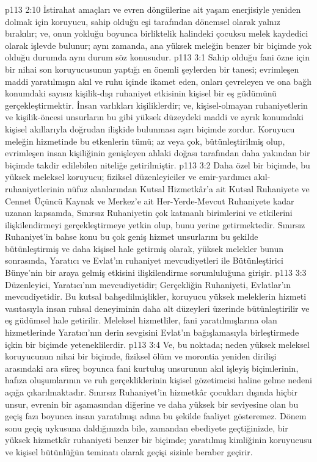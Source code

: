 \vs p113 2:10 İstirahat amaçları ve evren döngülerine ait yaşam enerjisiyle yeniden dolmak için koruyucu, sahip olduğu eşi tarafından dönemsel olarak yalnız bırakılır; ve, onun yokluğu boyunca birliktelik halindeki çocuksu melek kaydedici olarak işlevde bulunur; aynı zamanda, ana yüksek meleğin benzer bir biçimde yok olduğu durumda aynı durum söz konusudur.
\vs p113 3:1 Sahip olduğu fani özne için bir nihai son koruyucusunun yaptığı en önemli şeylerden bir tanesi; evrimleşen maddi yaratılmışın akıl ve ruhu içinde ikamet eden, onları çevreleyen ve ona bağlı konumdaki sayısız kişilik\hyp{}dışı ruhaniyet etkisinin kişisel bir eş güdümünü gerçekleştirmektir. İnsan varlıkları kişiliklerdir; ve, kişisel\hyp{}olmayan ruhaniyetlerin ve kişilik\hyp{}öncesi unsurların bu gibi yüksek düzeydeki maddi ve ayrık konumdaki kişisel akıllarıyla doğrudan ilişkide bulunması aşırı biçimde zordur. Koruyucu meleğin hizmetinde bu etkenlerin tümü; az veya çok, bütünleştirilmiş olup, evrimleşen insan kişiliğinin genişleyen ahlaki doğası tarafından daha yakından bir biçimde takdir edilebilen niteliğe getirilmiştir.
\vs p113 3:2 Daha özel bir biçimde, bu yüksek meleksel koruyucu; fiziksel düzenleyiciler ve emir\hyp{}yardımcı akıl\hyp{}ruhaniyetlerinin nüfuz alanlarından Kutsal Hizmetkâr’a ait Kutsal Ruhaniyete ve Cennet Üçüncü Kaynak ve Merkez’e ait Her\hyp{}Yerde\hyp{}Mevcut Ruhaniyete kadar uzanan kapsamda, Sınırsız Ruhaniyetin çok katmanlı birimlerini ve etkilerini ilişkilendirmeyi gerçekleştirmeye yetkin olup, bunu yerine getirmektedir. Sınırsız Ruhaniyet’in bahse konu bu çok geniş hizmet unsurlarını bu şekilde bütünleştirmiş ve daha kişisel hale getirmiş olarak, yüksek melekler bunun sonrasında, Yaratıcı ve Evlat’ın ruhaniyet mevcudiyetleri ile Bütünleştirici Bünye’nin bir araya gelmiş etkisini ilişkilendirme sorumluluğuna girişir.
\vs p113 3:3 Düzenleyici, Yaratıcı’nın mevcudiyetidir; Gerçekliğin Ruhaniyeti, Evlatlar’ın mevcudiyetidir. Bu kutsal bahşedilmişlikler, koruyucu yüksek meleklerin hizmeti vasıtasıyla insan ruhsal deneyiminin daha alt düzeyleri üzerinde bütünleştirilir ve eş güdümsel hale getirilir. Meleksel hizmetliler, fani yaratılmışlarına olan hizmetlerinde Yaratıcı’nın derin sevgisini Evlat’ın bağışlamasıyla birleştirmede içkin bir biçimde yeteneklilerdir.
\vs p113 3:4 Ve, bu noktada; neden yüksek meleksel koruyucunun nihai bir biçimde, fiziksel ölüm ve morontia yeniden dirilişi arasındaki ara süreç boyunca fani kurtuluş unsurunun akıl işleyiş biçimlerinin, hafıza oluşumlarının ve ruh gerçekliklerinin kişisel gözetimcisi haline gelme nedeni açığa çıkarılmaktadır. Sınırsız Ruhaniyet’in hizmetkâr çocukları dışında hiçbir unsur, evrenin bir aşamasından diğerine ve daha yüksek bir seviyesine olan bu geçiş fazı boyunca insan yaratılmışı adına bu şekilde faaliyet gösteremez. Dönem sonu geçiş uykusuna daldığınızda bile, zamandan ebediyete geçtiğinizde, bir yüksek hizmetkâr ruhaniyeti benzer bir biçimde; yaratılmış kimliğinin koruyucusu ve kişisel bütünlüğün teminatı olarak geçişi sizinle beraber geçirir.

